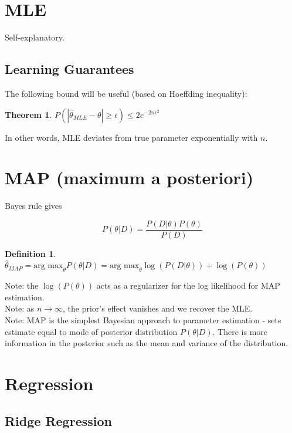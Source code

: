 \documentclass[a4paper]{article}\usepackage[]{graphicx}\usepackage[]{color}
\newtheorem{thm}{Theorem}[section]
\newtheorem{defn}{Definition}[section]
\begin{document}
\section{MLE}

Self-explanatory. 

\subsection{Learning Guarantees}

The following bound will be useful (based on Hoeffding inequality): 

\begin{thm}
$P(|\hat{\theta}_{MLE}-\theta| \geq \epsilon) \leq 2e^{-2n\epsilon^2}$
\end{thm}

In other words, MLE deviates from true parameter exponentially with $n$. 

\section{MAP (maximum a posteriori)}

Bayes rule gives 

\begin{equation*}
P(\theta|D) = \frac{P(D|\theta)P(\theta)}{P(D)}
\end{equation*}

\begin{defn}
$\hat{\theta}_{MAP} = \mbox{arg max}_{\theta} P(\theta|D) = \mbox{arg max}_{\theta} \log(P(D|\theta)) + \log(P(\theta)) $
\end{defn}

Note: the $\log(P(\theta))$ acts as a regularizer for the log likelihood for MAP estimation. \\
Note: as $n \rightarrow \infty$, the prior's effect vanishes and we recover the MLE.\\
Note: MAP is the simplest Bayesian approach to parameter estimation - sets estimate equal to mode of posterior distribution $P(\theta|D)$. There is more information in the posterior such as the mean and variance of the distribution. 


\section{Regression}

\subsection{Ridge Regression}
\end{document}
